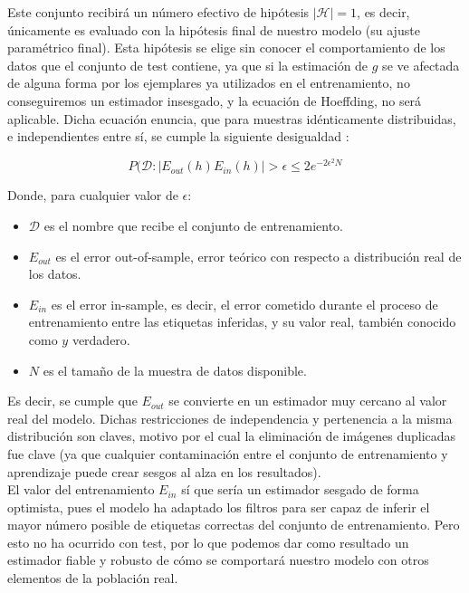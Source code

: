 Este conjunto recibirá un número efectivo de hipótesis $|\mathcal H|= 1$, es decir, únicamente es evaluado con la hipótesis final de nuestro modelo (su ajuste paramétrico final). Esta hipótesis se elige sin conocer el comportamiento de los datos que el conjunto de test contiene, ya que si la estimación de $g$ se ve afectada de alguna forma por los ejemplares ya utilizados en el entrenamiento, no conseguiremos un estimador insesgado, y la ecuación de Hoeffding, no será aplicable. Dicha ecuación enuncia, que para muestras idénticamente distribuidas, e independientes entre sí, se cumple la siguiente desigualdad \cite{Mostafa2012}:

$$P(\mathcal{D}: | E_{out}(h) E_{in}(h) |  > \epsilon \leq 2e^{-2\epsilon^2	N}$$

Donde, para cualquier valor de $\epsilon$:
\begin{itemize}
	\item $\mathcal{D}$ es el nombre que recibe el conjunto de entrenamiento.
	\item $ E_{out}$ es el error out-of-sample, error teórico con respecto a distribución real de los datos.
	\item  $E_{in}$ es el error in-sample, es decir, el error cometido durante el proceso de entrenamiento entre las etiquetas inferidas, y su valor real, también conocido como $y$ verdadero.
	\item $N$ es el tamaño de la muestra de datos disponible.
\end{itemize}

Es decir, se cumple que $E_{out}$ se convierte en un estimador muy cercano al valor real del modelo. Dichas restricciones de independencia y pertenencia a la misma distribución son claves,
 motivo por el cual la eliminación de imágenes duplicadas fue clave (ya que cualquier contaminación entre el conjunto de entrenamiento y aprendizaje puede crear sesgos al alza en los resultados). \\

El valor del entrenamiento $E_{in}$ sí que sería un estimador sesgado de forma optimista, pues el modelo ha adaptado los filtros para ser capaz de inferir el mayor número posible de etiquetas correctas del conjunto de entrenamiento. Pero esto no ha ocurrido con test, por lo que podemos dar como resultado un estimador fiable y robusto de cómo se comportará nuestro modelo con otros elementos de la población real.\\

